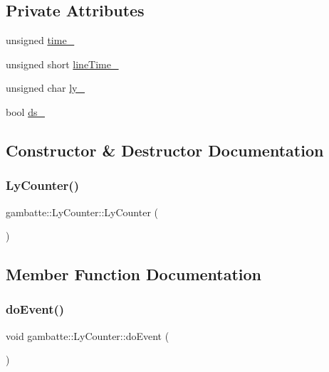\subsection*{Private Attributes}
\begin{DoxyCompactItemize}
\item 
unsigned \hyperlink{classgambatte_1_1LyCounter_a407688db8f9e99d68c88477c8e9692e9}{time\+\_\+}
\item 
unsigned short \hyperlink{classgambatte_1_1LyCounter_ad6af3d159fb0869f754d3b28f91855bd}{line\+Time\+\_\+}
\item 
unsigned char \hyperlink{classgambatte_1_1LyCounter_affac96507ddb30da083731914ba2b250}{ly\+\_\+}
\item 
bool \hyperlink{classgambatte_1_1LyCounter_a6acfa5087f6a95fc21fb90519b6ba356}{ds\+\_\+}
\end{DoxyCompactItemize}


\subsection{Constructor \& Destructor Documentation}
\mbox{\label{classgambatte_1_1LyCounter_ae00d817e2c66b471be768ed35ee3e4bf}} 
\subsubsection{\texorpdfstring{Ly\+Counter()}{LyCounter()}}
{\footnotesize\ttfamily gambatte\+::\+Ly\+Counter\+::\+Ly\+Counter (\begin{DoxyParamCaption}{ }\end{DoxyParamCaption})}



\subsection{Member Function Documentation}
\mbox{\label{classgambatte_1_1LyCounter_a2a1aad7968d8da16c73986d6d9ddc52a}} 
\subsubsection{\texorpdfstring{do\+Event()}{doEvent()}}
{\footnotesize\ttfamily void gambatte\+::\+Ly\+Counter\+::do\+Event (\begin{DoxyParamCaption}{ }\end{DoxyParamCaption})}

